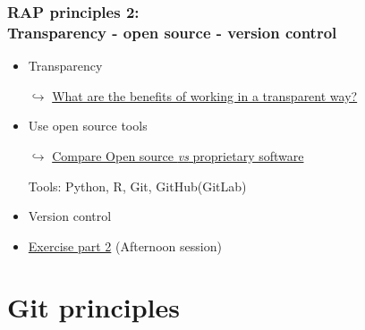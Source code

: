 \documentclass[xcolor=x11names,compress]{beamer}
\renewcommand{\(}{\begin{columns}}
\renewcommand{\)}{\end{columns}}
\newcommand{\<}[1]{\begin{column}{#1}}
\renewcommand{\>}{\end{column}}
\begin{document}
\begin{frame}[<+->]
   \frametitle{RAP principles 2:  \\Transparency - open source - version control }
   \pause
    \begin{itemize}[<+->]
      \item Transparency
     \item[$\hookrightarrow$]\href{https://sergegoussev.github.io/ESCAP_RAP_class/docs/teaching_materials/sept_18/sept_18_session.html\#principle-3-transparency}{What are the benefits of working in a transparent way? }
     \item Use open source tools
      \item[$\hookrightarrow$]\href{https://sergegoussev.github.io/ESCAP_RAP_class/docs/teaching_materials/sept_18/sept_18_session.html\#practical-set-two}{Compare Open source \emph{vs} proprietary software }
     \item[Tools:] Python, R, Git, GitHub(GitLab)
     \item Version control
     \item \href{https://sergegoussev.github.io/ESCAP_RAP_class/docs/teaching_materials/sept_18/sept_18_session.html\#excercize-1}{Exercise part 2} (Afternoon session)
    \end{itemize}
\end{frame}

\section{Git principles}
\end{document}
